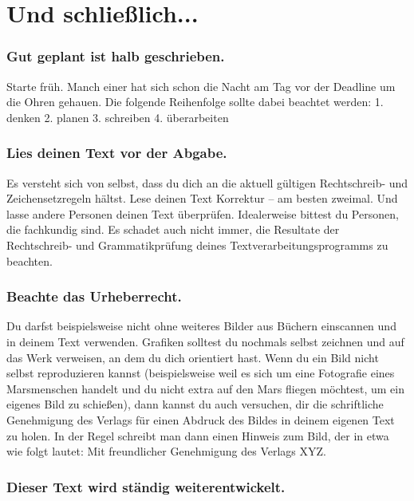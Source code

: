 \documentclass{../cssheet}
\begin{document}
\section{Und schließlich...}

\subsubsection*{Gut geplant ist halb geschrieben.}

Starte früh. Manch einer hat sich schon die Nacht am Tag vor der
Deadline um die Ohren gehauen. Die folgende Reihenfolge sollte dabei
beachtet werden: 1. denken 2. planen 3. schreiben 4. überarbeiten

\subsubsection*{Lies deinen Text vor der Abgabe.}

Es versteht sich von selbst, dass du dich an die aktuell gültigen
Rechtschreib- und Zeichensetzregeln hältst. Lese deinen Text Korrektur
-- am besten zweimal. Und lasse andere Personen deinen Text überprüfen.
Idealerweise bittest du Personen, die fachkundig sind. Es schadet auch
nicht immer, die Resultate der Rechtschreib- und Grammatikprüfung deines
Textverarbeitungsprogramms zu beachten.

\subsubsection*{Beachte das Urheberrecht.}

Du darfst beispielsweise nicht ohne weiteres Bilder aus Büchern
einscannen und in deinem Text verwenden. Grafiken solltest du nochmals
selbst zeichnen und auf das Werk verweisen, an dem du dich orientiert
hast. Wenn du ein Bild nicht selbst reproduzieren kannst (beispielsweise
weil es sich um eine Fotografie eines Marsmenschen handelt und du nicht
extra auf den Mars fliegen möchtest, um ein eigenes Bild zu schießen),
dann kannst du auch versuchen, dir die schriftliche Genehmigung des
Verlags für einen Abdruck des Bildes in deinem eigenen Text zu holen. In
der Regel schreibt man dann einen Hinweis zum Bild, der in etwa wie
folgt lautet: \glqq{}Mit freundlicher Genehmigung des Verlags XYZ\grqq{}.

\subsubsection*{Dieser Text wird ständig weiterentwickelt.}
\end{document}
